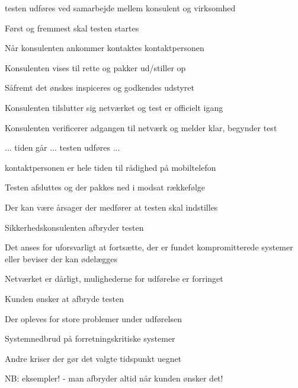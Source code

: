 \documentclass[20pt,landscape,a4paper,footrule]{foils}
\begin{document}
\begin{list1}
\item testen udføres ved samarbejde mellem konsulent og virksomhed
\item Først og fremmest skal testen startes
\begin{list2}
\item Når konsulenten ankommer kontaktes kontaktpersonen
\item Konsulenten vises til rette og pakker ud/stiller op
\item Såfremt det ønskes inspiceres og godkendes udstyret
\item Konsulenten tilslutter sig netværket og test er officielt igang
\item Konsulenten verificerer adgangen til netværk og melder klar,
  begynder test
\end{list2}
\item ... tiden går ... testen udføres ... 
\item kontaktpersonen er hele tiden til rådighed på mobiltelefon
\item Testen afsluttes og der pakkes ned i modsat rækkefølge  
\end{list1}



\begin{list1}
\item Der kan være årsager der medfører at testen skal indstilles
\item Sikkerhedskonsulenten afbryder testen
\begin{list2}
\item Det anses for uforsvarligt at fortsætte, der er fundet
  kompromitterede systemer eller beviser der kan ødelægges
\item Netværket er dårligt, mulighederne for udførelse er forringet
\end{list2}
\item Kunden ønsker at afbryde testen
\begin{list2}
\item Der opleves for store problemer under udførelsen
\item Systemnedbrud på forretningskritiske systemer
\item Andre kriser der gør det valgte tidspunkt uegnet 
\end{list2}
\item NB: eksempler! - man afbryder altid når kunden ønsker det!
\end{list1}
\end{document}
